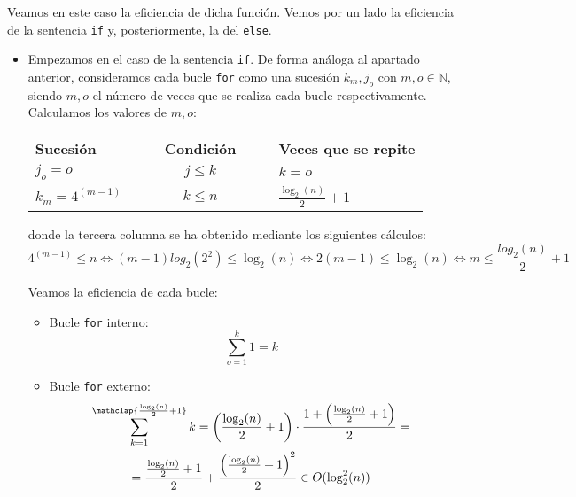 \begin{ejercicio}
\begin{enumerate}[label=\alph*)]
        Veamos en este caso la eficiencia de dicha función. Vemos por un lado la eficiencia de la sentencia \verb|if| y, posteriormente, la del \verb|else|. 
        \begin{itemize}
            \item Empezamos en el caso de la sentencia \verb|if|. De forma análoga al apartado anterior, consideramos cada bucle \verb|for| como una sucesión $k_m , j_o$ con $m, o\in \mathbb{N}$, siendo $m, o$ el número de veces que se realiza cada bucle respectivamente. Calculamos los valores de $m,o$:
            \begin{center}
                \begin{tabular}{l l l c l l l}
                    \textbf{Sucesión}    &&&  \textbf{Condición} &&& \textbf{Veces que se repite}\\
                    $j_o = o$            &&& $j\leq k$           &&& $ k = o$\\
                    $k_m = 4^{(m-1)}$    &&& $k\leq n$           &&& $\frac{\log_2(n)}{2} +1$\\
                \end{tabular}
            \end{center}
            donde la tercera columna se ha obtenido mediante los siguientes cálculos:
            \begin{equation*}
                4^{(m-1)} \leq n \Leftrightarrow (m-1) log_2 (2^2) \leq \log_2(n) \Leftrightarrow 2(m-1) \leq \log_2(n) \Leftrightarrow m\leq \frac{log_2(n)}{2} +1
            \end{equation*}
            
            Veamos la eficiencia de cada bucle:
            \begin{itemize}
                \item Bucle \verb|for| interno:
                \begin{equation*}
                    \sum_{o=1}^k 1= k
                \end{equation*}

                \item Bucle \verb|for| externo:
                \begin{multline*}
                    \sum_{k=1}^{\mathclap{\frac{\log_2(n)}{2}+1}} k = \left(\frac{\log_2(n)}{2}+1\right)\cdot \frac{1+\left(\frac{\log_2(n)}{2}+1\right)}{2} =\\= 
                    \frac{\frac{\log_2(n)}{2}+1}{2} + \frac{\left(\frac{\log_2(n)}{2}+1\right)^2}{2} \in O(\log_2^2(n))
                \end{multline*}
            \end{itemize}
            

\end{itemize}
\end{enumerate}
\end{ejercicio}
